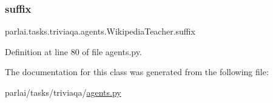 \mbox{\label{classparlai_1_1tasks_1_1triviaqa_1_1agents_1_1WikipediaTeacher_aff5be8d4af8ead80a67963cdfe9a7f08}} 
\subsubsection{\texorpdfstring{suffix}{suffix}}
{\footnotesize\ttfamily parlai.\+tasks.\+triviaqa.\+agents.\+Wikipedia\+Teacher.\+suffix}



Definition at line 80 of file agents.\+py.



The documentation for this class was generated from the following file\+:\begin{DoxyCompactItemize}
\item 
parlai/tasks/triviaqa/\hyperlink{parlai_2tasks_2triviaqa_2agents_8py}{agents.\+py}\end{DoxyCompactItemize}

